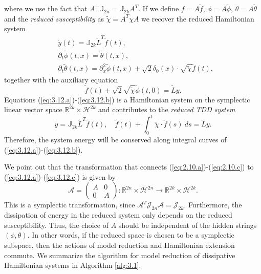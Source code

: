 where we use the fact that $A^+\mathbb J_{2n} = \mathbb{J}_{2k} A^T$. If we define $f = A \tilde f$, $\phi = A \tilde \phi$, $\theta = A\tilde \theta$ and the \emph{reduced susceptibility} as $\tilde \chi = A^T \chi A$ we recover the reduced Hamiltonian system
\begin{subequations}
\begin{align}
		\label{eq:3.12.a} & \dot{y}(t) = \mathbb J_{2k} {\tilde L}^T \tilde f(t), \\
		\label{eq:3.12.b} & \partial_t \tilde \phi(t,x) = \tilde \theta(t,x),\\
		\label{eq:3.12.c} & \partial_t \tilde \theta(t,x) = \partial_x^2 \tilde \phi(t,x) + \sqrt 2 \delta_0(x) \cdot \sqrt{\tilde \chi}  \tilde f(t),
\end{align}
\end{subequations}
together with the auxiliary equation
\begin{equation} \label{eq:3.13}
	\tilde f(t) + \sqrt{2} \sqrt{\tilde \chi} \tilde \phi(t,0) = \tilde L y.
\end{equation}
Equations (\ref{eq:3.12.a})-(\ref{eq:3.12.b}) is a Hamiltonian system on the symplectic linear vector space $\mathbb R^{2k} \times \mathcal H^{2k}$ and contributes to the \emph{reduced TDD system}
\begin{equation} \label{eq:3.14}
	\dot {y} = \mathbb J_{2k} \tilde L^T \tilde f(t), \quad \tilde f(t) + \int_0^t \tilde \chi\cdot \tilde f(s)\ ds = \tilde L y.
\end{equation}
Therefore, the system energy will be conserved along integral curves of (\ref{eq:3.12.a})-(\ref{eq:3.12.b}).

We point out that the transformation that connects (\ref{eq:2.10.a})-(\ref{eq:2.10.c}) to (\ref{eq:3.12.a})-(\ref{eq:3.12.c}) is given by
\begin{equation}
	\mathcal A = \begin{pmatrix}
		A& 0 \\
		0& A
	\end{pmatrix} : \mathbb R^{2n} \times \mathcal H^{2n} \to \mathbb R^{2k} \times \mathcal H^{2k}.
\end{equation}
This is a symplectic transformation, since $\mathcal A^T \mathcal J_{2n} \mathcal A = \mathcal J_{2k}$. Furthermore, the dissipation of energy in the reduced system only depends on the reduced susceptibility. Thus, the choice of $A$ should be independent of the hidden strings $(\phi, \theta)$. In other words, if the reduced space is chosen to be a symplectic subspace, then the actions of model reduction and Hamiltonian extension commute. We summarize the algorithm for model reduction of dissipative Hamiltonian systems in Algorithm \ref{alg:3.1}.

